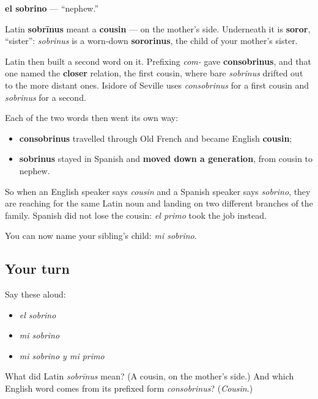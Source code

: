 \begin{cousinweb}
\textbf{el sobrino} — \textquotedblleft{}nephew.\textquotedblright{}

Latin \textbf{sobrīnus} meant a \textbf{cousin} — on the mother's side. Underneath it is \textbf{soror}, \textquotedblleft{}sister\textquotedblright{}: \emph{sobrinus} is a worn-down \textbf{sororinus}, the child of your mother's sister.

Latin then built a second word on it. Prefixing \emph{com-} gave \textbf{consobrinus}, and that one named the \textbf{closer} relation, the first cousin, where bare \emph{sobrinus} drifted out to the more distant ones. Isidore of Seville uses \emph{consobrinus} for a first cousin and \emph{sobrinus} for a second.

Each of the two words then went its own way:

\begin{itemize}
\raggedright
  \item \textbf{consobrinus} travelled through Old French and became English \textbf{cousin};
  \item \textbf{sobrinus} stayed in Spanish and \textbf{moved down a generation}, from cousin to nephew.
\end{itemize}

So when an English speaker says \emph{cousin} and a Spanish speaker says \emph{sobrino}, they are reaching for the same Latin noun and landing on two different branches of the family. Spanish did not lose the cousin: \emph{el primo} took the job instead.
\end{cousinweb}

\begin{grammarlens}[title={What you've built}]
You can now name your sibling's child: \emph{mi sobrino}.
\end{grammarlens}

\subsection*{Your turn}
Say these aloud:

\begin{itemize}
\raggedright
  \item \emph{el sobrino}
  \item \emph{mi sobrino}
  \item \emph{mi sobrino y mi primo}
\end{itemize}

\begin{tcolorbox}[breakable,colback=teal!4,colframe=teal!35!black,title={Before you move on}]
What did Latin \emph{sobrīnus} mean? (A cousin, on the mother's side.) And which English word comes from its prefixed form \emph{consobrinus}? (\emph{Cousin}.)
\end{tcolorbox}
